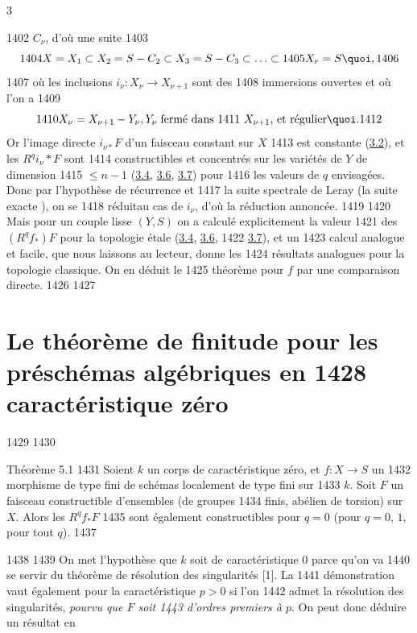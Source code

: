 3	\documentclass[10pt]{../fichiers-configuration-latex/smfart}
\begin{document}
  1402	$C_{\nu}$, d'où une suite
  1403	$$
  1404	X=X_1\subset X_2=S-C_2\subset X_3=S-C_3\subset\ldots \subset
  1405	X_r=S{\quoi},
  1406	$$
  1407	où les inclusions $i_{\nu}:X_{\nu}\rightarrow X_{\nu +1}$ sont des
  1408	immersions ouvertes et où l'on a
  1409	$$
  1410	X_{\nu}=X_{\nu+1}-Y_{\nu}, Y_{\nu}\;\mbox{\rm fermé dans
  1411	$X_{\nu+1}$, et régulier}{\quoi}.
  1412	$$ Or l'image directe $i_{\nu\ast}F$ d'un faisceau constant sur $X$
  1413	est constante (\hyperref[XVI.prop3.2]{3.2}), et les $R^{q}i_{\nu}\ast F$ sont
  1414	constructibles et concentrés sur les variétés de $Y$ de dimension
  1415	$\leq n-1$ (\hyperref[XVI.cor3.4]{3.4}, \hyperref[XVI.cor3.6]{3.6}, \hyperref[XVI.thm3.7]{3.7}) pour
  1416	les valeurs de $q$ envisagées. Donc par l'hypothèse de récurrence et
  1417	la suite spectrale de Leray (\resp la suite exacte ), on se
  1418	réduit\pageoriginale au cas de $i_{\nu}$, d'où la réduction annoncée.
  1419	
  1420	Mais pour un couple lisse $(Y,S)$ on a calculé explicitement la valeur
  1421	des $(R^{q}f_{\ast})F$ pour la topologie étale (\hyperref[XVI.cor3.4]{3.4}, \hyperref[XVI.cor3.6]{3.6}, 
  1422	\hyperref[XVI.thm3.7]{3.7}), et un
  1423	calcul analogue et facile, que nous laissons au lecteur, donne les
  1424	résultats analogues pour la topologie classique. On en déduit le
  1425	théorème pour $f$ par une comparaison directe.
  1426	
  1427	\section{Le théorème de finitude pour les préschémas algébriques en
  1428	caractéristique zéro}
  1429	
  1430	\begin{enonce*}{Théorème 5.1}
  1431	Soient $k$ un corps de caractéristique zéro, et $f:X\rightarrow S$ un
  1432	morphisme de type fini de schémas localement de type fini sur
  1433	$k$. Soit $F$ un faisceau constructible d'ensembles (\resp de groupes
  1434	finis, \resp abélien de torsion) sur $X$. Alors les $R^{q}f_{\ast}F$
  1435	sont également constructibles pour $q=0$ (\resp pour $q=0$, $1$, 	pour tout $q$).
  1437	\end{enonce*}
  1438	
  1439	On met l'hypothèse que $k$ soit de caractéristique $0$ parce qu'on va
  1440	se servir du théorème de résolution des singularités [1]. La
  1441	démonstration vaut également pour la caractéristique $p>0$ si l'on
  1442	admet la résolution des singularités, \emph{pourvu que $F$ soit
  1443	d'ordres premiers à $p$}. On peut donc déduire un résultat en
\end{document}
